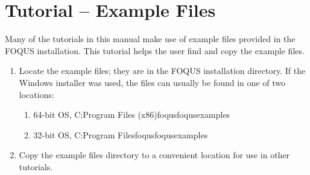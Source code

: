 \section{Tutorial -- Example Files}\label{tutorial.example.files}

Many of the tutorials in this manual make use of example files provided in the FOQUS installation.  This tutorial helps the user find and copy the example files.

\begin{enumerate}
	\item Locate the example files; they are in the FOQUS installation directory.  If the Windows installer was used, the files can usually be found in one of two locations:
	\begin{enumerate}
		\item 64-bit OS, C:\bs Program Files (x86)\bs foqus\bs foqus\bs examples
		\item 32-bit OS, C:\bs Program Files\bs foqus\bs foqus\bs examples
	\end{enumerate}
	\item Copy the example files directory to a convenient location for use in other tutorials.
\end{enumerate}